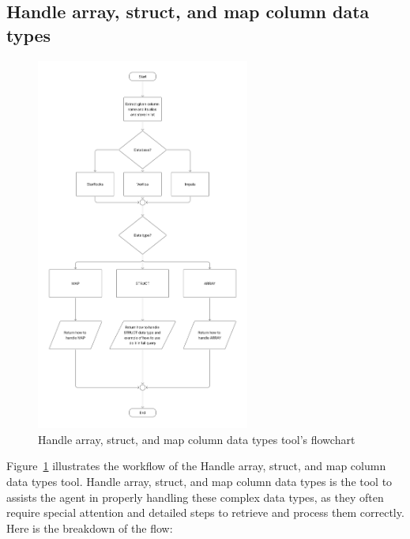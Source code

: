     \subsection{Handle array, struct, and map column data types}
    \begin{figure}[H]
        \centering
        \includegraphics[width=7cm]{chapters/3/figures/array_struct.jpg}
        \caption[Handle array, struct, and map column data types tool’s flowchart]{Handle array, struct, and map column data types tool’s flowchart}
        \label{fig:array_struct}
    \end{figure}
    Figure~\ref{fig:array_struct} illustrates the workflow of the Handle array, struct, and map column data types tool. Handle array, struct, and map column data types is the tool to assists the agent in properly handling these complex data types, as they often require special attention and detailed steps to retrieve and process them correctly.
    Here is the breakdown of the flow:
